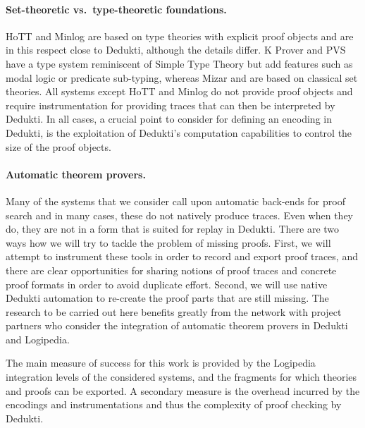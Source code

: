 \paragraph*{Set-theoretic vs.\ type-theoretic foundations.}
HoTT and Minlog are based on type theories with explicit proof objects
and are in this respect close to Dedukti, although the details
differ. K Prover and PVS have a type system reminiscent of Simple Type
Theory but add features such as modal logic or predicate sub-typing,
whereas Mizar and \tlaplus are based on classical set theories. All
systems except HoTT and Minlog do not provide proof objects and
require instrumentation for providing traces that can then be
interpreted by Dedukti. In all cases, a crucial point to consider for
defining an encoding in Dedukti, is the exploitation of Dedukti's
computation capabilities to control the size of the proof objects.

\paragraph*{Automatic theorem provers.}
Many of the systems that we consider call upon automatic back-ends for proof
search and in many cases, these do not natively produce traces. Even
when they do, they are not in a form that is suited for replay in
Dedukti. There are two ways how we will try to tackle the problem of
missing proofs. First, we will attempt to instrument
these tools in
order to record and export proof traces, and there are clear
opportunities for sharing notions of proof traces and concrete proof
formats in order to avoid duplicate effort. Second, we will use native
Dedukti automation to re-create the proof parts that are still missing.
The research to be carried out here benefits greatly from the network with
project partners who consider the integration of automatic theorem provers in
Dedukti and Logipedia.

The main measure of success for this work is provided by the Logipedia
integration levels of the considered systems, and the fragments for which
theories and proofs can be exported. A secondary measure is the overhead
incurred by the encodings and instrumentations and thus the complexity of proof
checking by Dedukti.


